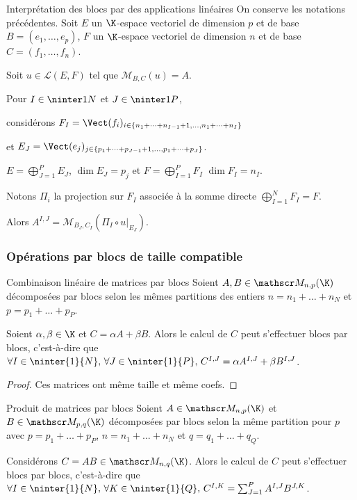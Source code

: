 \begin{proposition}{Interprétation des blocs par des applications linéaires}{}
    On conserve les notations précédentes. Soit $E$ un $\K$-espace vectoriel de dimension $p$ et de base $B = (e_1, \dots, e_p)$,
    $F$ un $\K$-espace vectoriel de dimension $n$ et de base $C = (f_1, \dots, f_n)$.

    Soit $u \in \mathscr L(E, F)$ tel que $\mathscr M_{B, C}(u) = A$.

    Pour $I \in \ninter 1 N$ et $J \in \ninter 1 P$, 
    
    considérons 
    $F_I = \Vect (f_i)_{i \in \{n_1 + \dots + n_{I - 1} + 1, \dots , n_1 + \dots + n_I\}}$ 

    et $E_J = \Vect (e_j)_{j \in \{p_1 + \dots + p_{J - 1} + 1, \dots , p_1 + \dots + p_J\}}$.

    $E = \bigoplus_{J=1}^P E_J$, $\dim E_J = p_j$ et $F = \bigoplus_{I=1}^P F_I$ 
    $\dim F_I = n_I$.

    Notons $\Pi_i$ la projection sur $F_I$ associée à la somme directe $\bigoplus_{I=1}^N F_I = F$.

    Alors $A^{I, J} = \mathscr M_{B_J, C_I}(\Pi_I \circ u|_{E_J})$.
\end{proposition}

\subsubsection{Opérations par blocs de taille compatible }

\begin{proposition}{Combinaison linéaire de matrices par blocs}{}
    Soient $A, B \in \mathscr M_{n, p}(\K)$ décomposées par blocs selon les mêmes partitions des entiers 
    $n = n_1 + \dots + n_N$ et $p = p_1 + \dots + p_P$.

    Soient $\alpha, \beta \in \K$ et $C = \alpha A + \beta B$. Alors le calcul de $C$ peut s'effectuer 
    blocs par blocs, c'est-à-dire que 
    $\forall I \in \ninter{1}{N}, \, \forall J \in \ninter{1}{P}, \, C^{I, J} = \alpha A^{I, J} + \beta B^{I, J}$.
\end{proposition}

\begin{proof}
    Ces matrices ont même taille et même coefs. 
\end{proof}

\begin{proposition}{Produit de matrices par blocs}{}
    Soient $A \in \mathscr M_{n, p}(\K)$ et $B \in \mathscr M_{p, q}(\K)$ décomposées par blocs selon la même 
    partition pour $p$ avec $p = p_1 + \dots + p_P$, $n = n_1 + \dots + n_N$ et $q = q_1 + \dots + q_Q$.
    
    Considérons $C = AB \in \mathscr M_{n, q}(\K)$. Alors le calcul de $C$ peut s'effectuer blocs par blocs, c'est-à-dire que 
    $\forall I \in \ninter{1}{N}, \, \forall K \in \ninter{1}{Q}, \, C^{I, K} = \sum_{J=1}^P A^{I, J} B^{J, K}$.
\end{proposition}

